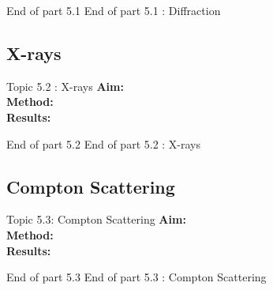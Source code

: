 %  
\begin{frame}{}
\small

\end{frame}

 \begin{frame}{End of part 5.1}
 End of part 5.1 : Diffraction\\[1ex]

\end{frame}



\subsection{X-rays}

\begin{frame}{Topic 5.2 : X-rays}
\small
\textbf{Aim:}\\
\textbf{Method:}\\
\textbf{Results:}\\
\end{frame}


\begin{frame}{}
\small

\end{frame}


 \begin{frame}{End of part 5.2}
End of part 5.2 : X-rays\\[1ex]

\end{frame}



\subsection{Compton Scattering}


\begin{frame}{Topic 5.3: Compton Scattering}
\small
\textbf{Aim:}\\
\textbf{Method:}\\
\textbf{Results:}\\
\end{frame}


\begin{frame}{}
\small

\end{frame}


 \begin{frame}{End of part 5.3}
End of part 5.3 : Compton Scattering\\[1ex]

\end{frame}



 
